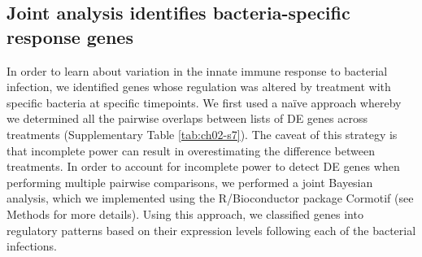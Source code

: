\subsection{Joint analysis identifies bacteria-specific response
genes}\label{joint-analysis-identifies-bacteria-specific-response-genes}

In order to learn about variation in the innate immune response to
bacterial infection, we identified genes whose regulation was altered
by treatment with specific bacteria at specific timepoints. We first
used a naïve approach whereby we determined all the pairwise overlaps
between lists of DE genes across treatments (Supplementary Table
\ref{tab:ch02-s7}). The caveat of this strategy is that incomplete
power can result in overestimating the difference between
treatments. In order to account for incomplete power to detect DE
genes when performing multiple pairwise comparisons, we performed a
joint Bayesian analysis, which we implemented using the R/Bioconductor
package Cormotif \citep{Wei2015} (see Methods for more details). Using
this approach, we classified genes into regulatory patterns based on
their expression levels following each of the bacterial infections.


